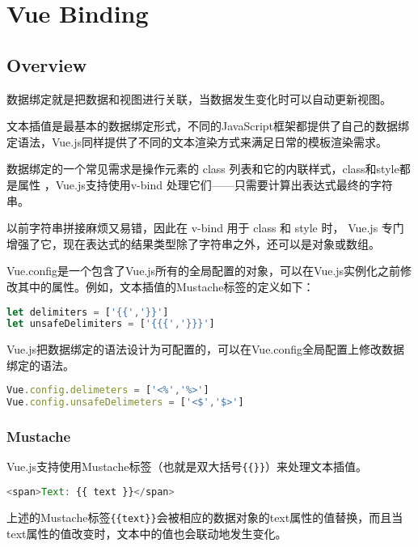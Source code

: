 \part{Vue Binding}


\chapter{Overview}

数据绑定就是把数据和视图进行关联，当数据发生变化时可以自动更新视图。


文本插值是最基本的数据绑定形式，不同的JavaScript框架都提供了自己的数据绑定语法，Vue.js同样提供了不同的文本渲染方式来满足日常的模板渲染需求。

数据绑定的一个常见需求是操作元素的 class 列表和它的内联样式，class和style都是属性 ，Vue.js支持使用v-bind 处理它们——只需要计算出表达式最终的字符串。

以前字符串拼接麻烦又易错，因此在 v-bind 用于 class 和 style 时， Vue.js 专门增强了它，现在表达式的结果类型除了字符串之外，还可以是对象或数组。




Vue.config是一个包含了Vue.js所有的全局配置的对象，可以在Vue.js实例化之前修改其中的属性。例如，文本插值的Mustache标签的定义如下：


\begin{lstlisting}[language=JavaScript]
let delimiters = ['{{','}}']
let unsafeDelimiters = ['{{{','}}}']
\end{lstlisting}

Vue.js把数据绑定的语法设计为可配置的，可以在Vue.config全局配置上修改数据绑定的语法。

\begin{lstlisting}[language=JavaScript]
Vue.config.delimeters = ['<%','%>']
Vue.config.unsafeDelimeters = ['<$','$>']
\end{lstlisting}




\section{Mustache}


Vue.js支持使用Mustache标签（也就是双大括号\texttt{\{\{\}\}}）来处理文本插值。


\begin{lstlisting}[language=JavaScript]
<span>Text: {{ text }}</span>
\end{lstlisting}

上述的Mustache标签\texttt{\{\{text\}\}}会被相应的数据对象的text属性的值替换，而且当text属性的值改变时，文本中的值也会联动地发生变化。

